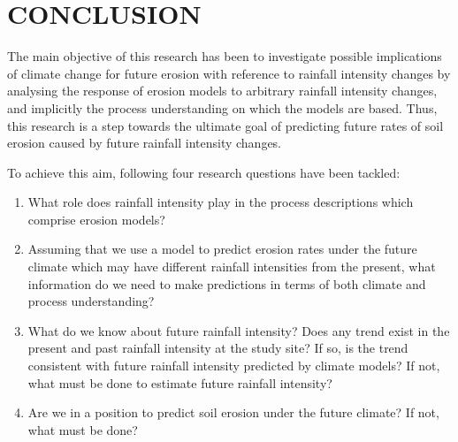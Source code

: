 \chapter{CONCLUSION}
\label{sec:CONCLUSION}

The main objective of this research has been to investigate possible
implications of climate change for future erosion with reference to rainfall
intensity changes by analysing the response of erosion models to arbitrary
rainfall intensity changes, and implicitly the process understanding on which
the models are based.
Thus, this research is a step towards the ultimate goal of predicting future
rates of soil erosion caused by future rainfall intensity changes.

To achieve this aim, following four research questions have been tackled:
\begin{enumerate}[{Question} 1.]
  \item What role does rainfall intensity play in the process descriptions which
comprise erosion models?
  \item Assuming that we use a model to predict erosion rates under the future
climate which may have different rainfall intensities from the present, what
information do we need to make predictions in terms of both climate and process
understanding?
  \item What do we know about future rainfall intensity? Does any trend exist in
the present and past rainfall intensity at the study site? If so, is the trend
consistent with future rainfall intensity predicted by climate models? If not,
what must be done to estimate future rainfall intensity?
  \item Are we in a position to predict soil erosion under the future climate?
If not, what must be done?
\end{enumerate}


